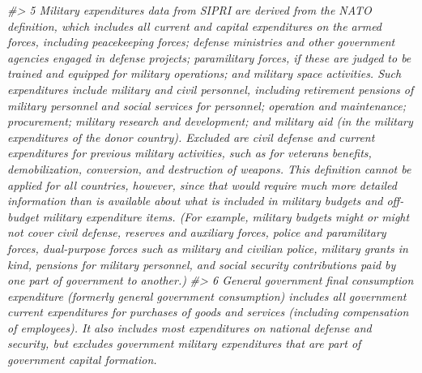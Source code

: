 \documentclass[
  xelatex, ja=standard]{bxjsbook}
\newenvironment{Shaded}{\begin{snugshade}}{\end{snugshade}}
\newcommand{\CommentTok}[1]{\textcolor[rgb]{0.56,0.35,0.01}{\textit{#1}}}
\theoremstyle{definition}
\theoremstyle{definition}
\theoremstyle{definition}
\theoremstyle{definition}
\theoremstyle{remark}
\begin{document}
\begin{Shaded}
\begin{Highlighting}[]
\CommentTok{\#\textgreater{} 5  Military expenditures data from SIPRI are derived from the NATO definition, which includes all current and capital expenditures on the armed forces, including peacekeeping forces; defense ministries and other government agencies engaged in defense projects; paramilitary forces, if these are judged to be trained and equipped for military operations; and military space activities. Such expenditures include military and civil personnel, including retirement pensions of military personnel and social services for personnel; operation and maintenance; procurement; military research and development; and military aid (in the military expenditures of the donor country). Excluded are civil defense and current expenditures for previous military activities, such as for veterans\textquotesingle{} benefits, demobilization, conversion, and destruction of weapons. This definition cannot be applied for all countries, however, since that would require much more detailed information than is available about what is included in military budgets and off{-}budget military expenditure items. (For example, military budgets might or might not cover civil defense, reserves and auxiliary forces, police and paramilitary forces, dual{-}purpose forces such as military and civilian police, military grants in kind, pensions for military personnel, and social security contributions paid by one part of government to another.)}
\CommentTok{\#\textgreater{} 6                                                                                                                                                                                                                                                                                                                                                                                                                                                                                                                                                                                                                                                                                                                                                                                                                                                                                                                                                                                                                                                               General government final consumption expenditure (formerly general government consumption) includes all government current expenditures for purchases of goods and services (including compensation of employees). It also includes most expenditures on national defense and security, but excludes government military expenditures that are part of government capital formation.}

\end{Highlighting}
\end{Shaded}
\end{document}
